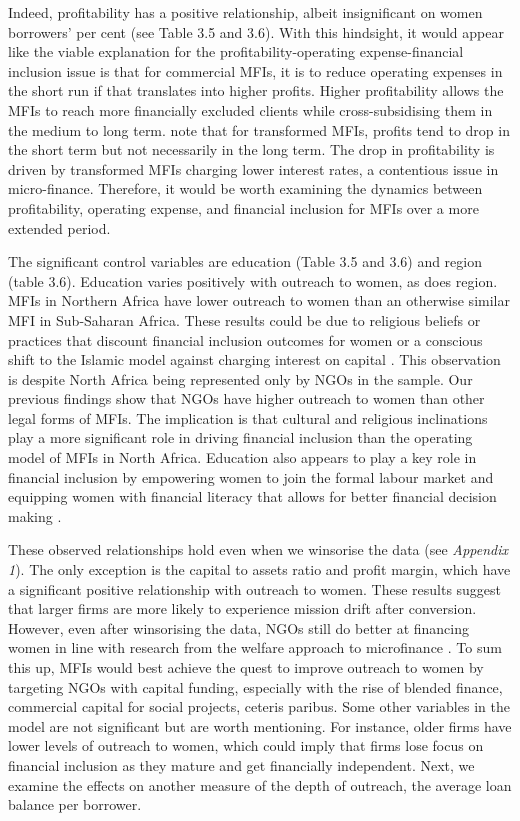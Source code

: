 \documentclass[a4paper, nobind]{templates/ociamthesis}
\begin{document}
Indeed, profitability has a positive relationship, albeit insignificant on women borrowers' per cent (see Table 3.5 and 3.6). With this hindsight, it would appear like the viable explanation for the profitability-operating expense-financial inclusion issue is that for commercial MFIs, it is to reduce operating expenses in the short run if that translates into higher profits. Higher profitability allows the MFIs to reach more financially excluded clients while cross-subsidising them in the medium to long term. \textcite{d2017ngos} note that for transformed MFIs, profits tend to drop in the short term but not necessarily in the long term. The drop in profitability is driven by transformed MFIs charging lower interest rates, a contentious issue in micro-finance. Therefore, it would be worth examining the dynamics between profitability, operating expense, and financial inclusion for MFIs over a more extended period.

The significant control variables are education (Table 3.5 and 3.6) and region (table 3.6). Education varies positively with outreach to women, as does region. MFIs in Northern Africa have lower outreach to women than an otherwise similar MFI in Sub-Saharan Africa. These results could be due to religious beliefs or practices that discount financial inclusion outcomes for women or a conscious shift to the Islamic model against charging interest on capital \autocite{hassan2018religious}. This observation is despite North Africa being represented only by NGOs in the sample. Our previous findings show that NGOs have higher outreach to women than other legal forms of MFIs. The implication is that cultural and religious inclinations play a more significant role in driving financial inclusion than the operating model of MFIs in North Africa. Education also appears to play a key role in financial inclusion by empowering women to join the formal labour market and equipping women with financial literacy that allows for better financial decision making \autocite{zins2016determinants,chikalipah2017determines}.

These observed relationships hold even when we winsorise the data (see \emph{Appendix 1}). The only exception is the capital to assets ratio and profit margin, which have a significant positive relationship with outreach to women. These results suggest that larger firms are more likely to experience mission drift after conversion. However, even after winsorising the data, NGOs still do better at financing women in line with research from the welfare approach to microfinance \autocite{kodongo2013individual}. To sum this up, MFIs would best achieve the quest to improve outreach to women by targeting NGOs with capital funding, especially with the rise of blended finance, commercial capital for social projects, ceteris paribus. Some other variables in the model are not significant but are worth mentioning. For instance, older firms have lower levels of outreach to women, which could imply that firms lose focus on financial inclusion as they mature and get financially independent. Next, we examine the effects on another measure of the depth of outreach, the average loan balance per borrower.
\end{document}
